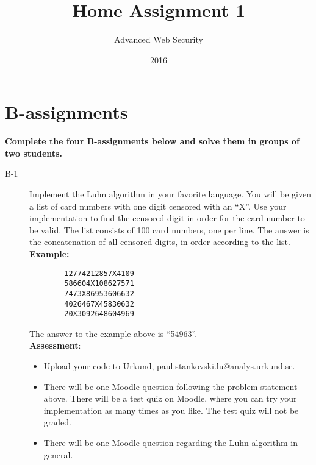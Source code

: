 \documentclass{article}
\begin{document}
\title{Home Assignment 1}
\author{Advanced Web Security}
\date{2016}

\maketitle

\section*{B-assignments}
\textbf{Complete the four B-assignments below and solve them in groups of two students.}

\begin{description}

	\item[B-1]{Implement the Luhn algorithm in your favorite language. You will be given
	a list of card numbers with one digit censored with an ``X''. Use your implementation to find the
	censored digit in order for the card number to be valid. The list consists of 100 card numbers,
	one per line. The answer is the concatenation of all censored digits, 
	in order according to the list.\\
	\textbf{Example:}
	\begin{verbatim}
		12774212857X4109
		586604X108627571
		7473X86953606632
		4026467X45830632
		20X3092648604969
	\end{verbatim}
	The answer to the example above is ``54963''.\\
	\textbf{Assessment}:
	\begin{itemize}
		\item Upload your code to Urkund, paul.stankovski.lu@analys.urkund.se.
		\item There will be one Moodle question following the problem statement above.
		There will be a test quiz on Moodle, where you can try your implementation as many times as you like.
		The test quiz will not be graded.
		\item There will be one Moodle question regarding the Luhn algorithm in general.
	\end{itemize}
	}


\end{description}
\end{document}
